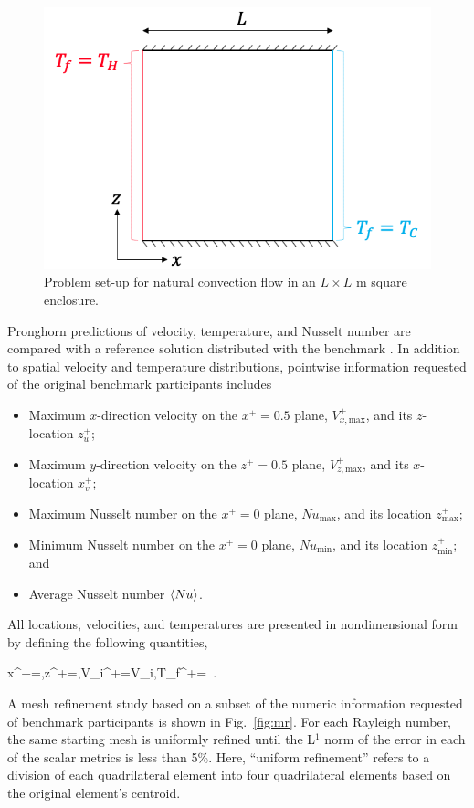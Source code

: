 \begin{figure}[!h]
\centering
\includegraphics[width=0.5\linewidth]{figs/rb_cell.png}
\caption{Problem set-up for natural convection flow in an \(L\times L\) \si{\meter} square enclosure.}
\label{fig:rb_cell}
\end{figure}

Pronghorn predictions of velocity, temperature, and Nusselt number are compared with a reference solution distributed with the benchmark \cite{davis}. In addition to spatial velocity and temperature distributions, pointwise information requested of the original benchmark participants includes

\begin{itemize}
\itemsep0em
\item Maximum \(x\)-direction velocity on the \(x^+=0.5\) plane, \(V^+_{x,\text{max}}\), and its \(z\)-location \(z^+_u\);
\item Maximum \(y\)-direction velocity on the \(z^+=0.5\) plane, \(V^+_{z,\text{max}}\), and its \(x\)-location \(x^+_v\);
\item Maximum Nusselt number on the \(x^+=0\) plane, \(Nu_\text{max}\), and its location \(z^+_\text{max}\);
\item Minimum Nusselt number on the \(x^+=0\) plane, \(Nu_\text{min}\), and its location \(z^+_\text{min}\); and
\item Average Nusselt number \(\langle Nu\rangle\).
\end{itemize}

All locations, velocities, and temperatures are presented in nondimensional form by defining the following quantities,

\beq
\label{eq:nondim_x}
x^+=,\quad z^+=,\quad V_i^+=V_i,\quad T_f^+=\ .
\eeq

\noindent A mesh refinement study based on a subset of the numeric information requested of benchmark participants is shown in Fig.\ \ref{fig:mr}. For each Rayleigh number, the same starting mesh is uniformly refined until the L$^1$ norm of the error in each of the scalar metrics is less than 5\%. Here, ``uniform refinement'' refers to a division of each quadrilateral element into four quadrilateral elements based on the original element's centroid. 

